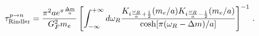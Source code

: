 \begin{equation} 
{\tau}^{p  \to n}_{\rm Rindler} 
= 
\frac{\pi^2 a e^{\pi \frac{\Delta m}{a}}}{G_F^2 m_e} 
\left[ 
\int_{-\infty}^{+\infty} d {\omega_R} 
\frac{ 
     K_{i \frac{{\omega_R}}{a} + \frac{1}{2}} ( m_e/a) 
     K_{i \frac{{\omega_R}}{a} - \frac{1}{2}} ( m_e/a)   
    } 
    {\cosh[\pi ({\omega_R} -{\Delta m})/a ] } 
\right]^{-1} 
\, . 
\label{TAF} 
\end{equation} 
